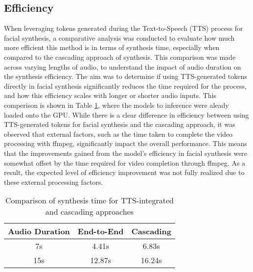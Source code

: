 \subsection{Efficiency}
\label{sec:efficiency}

When leveraging tokens generated during the Text-to-Speech (TTS) process for facial synthesis, a comparative analysis was conducted to evaluate how much more efficient this method is in terms of synthesis time, especially when compared to the cascading approach of synthesis. This comparison was made across varying lengths of audio, to understand the impact of audio duration on the synthesis efficiency. The aim was to determine if using TTS-generated tokens directly in facial synthesis significantly reduces the time required for the process, and how this efficiency scales with longer or shorter audio inputs.
This comperison is shown in Table \ref{tab:efficiency}, where the models to inference were aleady loaded onto the GPU.
While there is a clear difference in efficiency between using TTS-generated tokens for facial synthesis and the cascading approach, it was observed that external factors, such as the time taken to complete the video processing with ffmpeg, significantly impact the overall performance. This means that the improvements gained from the model's efficiency in facial synthesis were somewhat offset by the time required for video completion through ffmpeg. As a result, the expected level of efficiency improvement was not fully realized due to these external processing factors. 
\begin{table}
    \centering
    \begin{tabular}{ccc}
        \hline
        Audio Duration & End-to-End & Cascading \\
        \hline
        7s & 4.41s & 6.83s \\
        \hline
        15s & 12.87s & 16.24s \\
        \hline
    \end{tabular}
    \caption{Comparison of synthesis time for TTS-integrated and cascading approaches}
    \label{tab:efficiency}
\end{table}